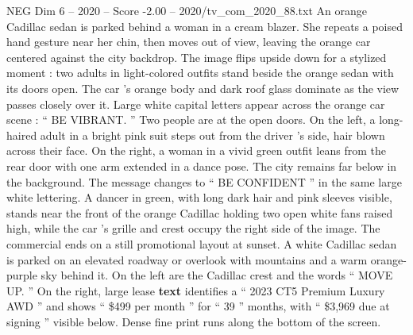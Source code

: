 \begin{textsample}{NEG Dim 6 – 2020 – Score -2.00 – 2020/tv\_com\_2020\_88.txt}
An orange Cadillac sedan is parked behind a woman in a cream blazer.
She repeats a poised hand gesture near her chin, then moves out of view, leaving the orange car centered against the city backdrop.
The image flips upside down for a stylized moment : two adults in light-colored outfits stand beside the orange sedan with its doors open.
The car ’s orange body and dark roof glass dominate as the view passes closely over it.
Large white capital letters appear across the orange car scene : “ BE VIBRANT. ” Two people are at the open doors.
On the left, a long-haired adult in a bright pink suit steps out from the driver ’s side, hair blown across their face.
On the right, a woman in a vivid green outfit leans from the rear door with one arm extended in a dance pose.
The city remains far below in the background.
The message changes to “ BE CONFIDENT ” in the same large white lettering.
A dancer in green, with long dark hair and pink sleeves visible, stands near the front of the orange Cadillac holding two open white fans raised high, while the car ’s grille and crest occupy the right side of the image.
The commercial ends on a still promotional layout at sunset.
A white Cadillac sedan is parked on an elevated roadway or overlook with mountains and a warm orange-purple sky behind it.
On the left are the Cadillac crest and the words “ MOVE UP. ” On the right, large lease \textbf{text} identifies a “ 2023 CT5 Premium Luxury AWD ” and shows “ \$499 per month ” for “ 39 ” months, with “ \$3,969 due at signing ” visible below.
Dense fine print runs along the bottom of the screen.

\end{textsample}
